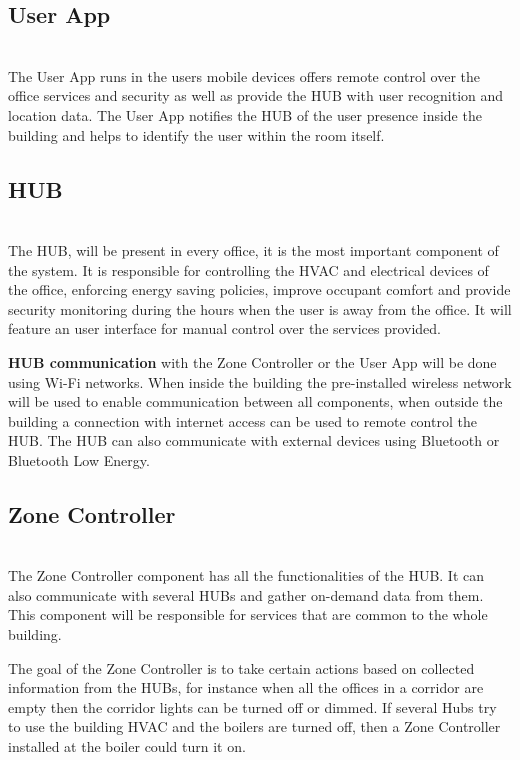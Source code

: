 \subsection{User App}\mbox{}\\

The User App runs in the users mobile devices offers remote control over the office services and security as well as provide the HUB with user recognition and location data. The User App notifies the HUB of the user presence inside the building and helps to identify the user within the room itself.



\subsection{HUB}\mbox{}\\

The HUB, will be present in every office, it is the most important component of the system. It is responsible for controlling the HVAC and electrical devices of the office, enforcing energy saving policies, improve occupant comfort and provide security monitoring during the hours when the user is away from the office.
It will feature an user interface for manual control over the services provided.

\textbf{HUB communication} with the Zone Controller or the User App will be done using Wi-Fi networks. When inside the building the pre-installed wireless network will be used to enable communication between all components, when outside the building a connection with internet access can be used to remote control the HUB. The HUB can also communicate with external devices using Bluetooth or Bluetooth Low Energy.


\subsection{Zone Controller}\mbox{}\\

The Zone Controller component has all the functionalities of the HUB. It can also communicate with several HUBs and gather on-demand data from them. This component will be responsible for services that are common to the whole building.

The goal of the Zone Controller is to take certain actions based on collected information from the HUBs, for instance when all the offices in a corridor are empty then the corridor lights can be turned off or dimmed. If several Hubs try to use the building HVAC and the boilers are turned off, then a Zone Controller installed at the boiler could turn it on. 

